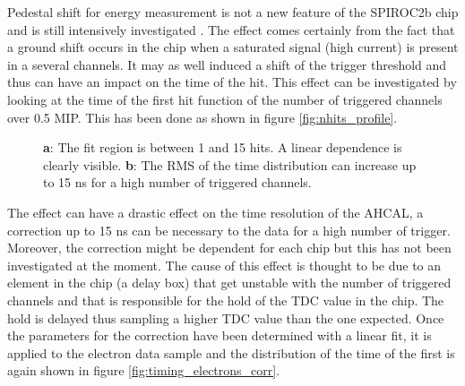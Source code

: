 \documentclass[twoside,a4paper,11pt]{article}
\begin{document}
Pedestal shift for energy measurement is not a new feature of the SPIROC2b chip and is still intensively investigated \cite{OskarMaster}. The effect comes certainly from the fact that a ground shift occurs in the chip when a saturated signal (high current) is present in a several channels. It may as well induced a shift of the trigger threshold and thus can have an impact on the time of the hit. This effect can be investigated by looking at the time of the first hit function of the number of triggered channels over 0.5 MIP. This has been done as shown in figure \ref{fig:nhits_profile}.
\begin{figure}[htbp]
	\hfill
	\caption[]{\textbf{a}: The fit region is between 1 and 15 hits. A linear dependence is clearly visible. \textbf{b}: The RMS of the time distribution can increase up to 15 ns for a high number of triggered channels.}
\end{figure}
The effect can have a drastic effect on the time resolution of the AHCAL, a correction up to 15 ns can be necessary to the data for a high number of trigger. Moreover, the correction might be dependent for each chip but this has not been investigated at the moment. The cause of this effect is thought to be due to an element in the chip (a delay box) that get unstable with the number of triggered channels and that is responsible for the hold of the TDC value in the chip. The hold is delayed thus sampling a higher TDC value than the one expected. Once the parameters for the correction have been determined with a linear fit, it is applied to the electron data sample and the distribution of the time of the first is again shown in figure \ref{fig:timing_electrons_corr}.
\end{document}
